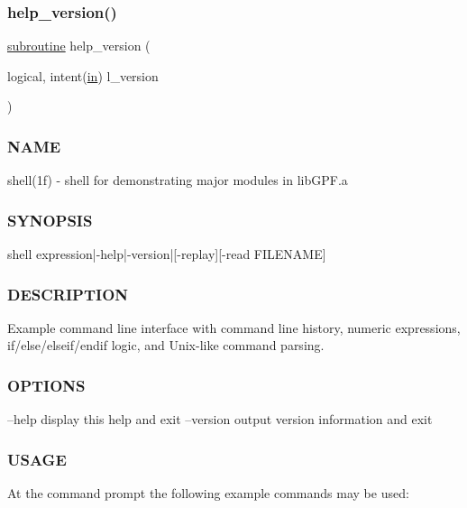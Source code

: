 \subsubsection{\texorpdfstring{help\+\_\+version()}{help\_version()}}
{\footnotesize\ttfamily \hyperlink{M__stopwatch_83_8txt_acfbcff50169d691ff02d4a123ed70482}{subroutine} help\+\_\+version (\begin{DoxyParamCaption}\item[{logical, intent(\hyperlink{M__journal_83_8txt_afce72651d1eed785a2132bee863b2f38}{in})}]{l\+\_\+version }\end{DoxyParamCaption})}



\subsubsection*{N\+A\+ME}

shell(1f) -\/ shell for demonstrating major modules in lib\+G\+P\+F.\+a 

\subsubsection*{S\+Y\+N\+O\+P\+S\+IS}

\begin{DoxyVerb}    shell expression|-help|-version|[-replay][-read FILENAME]
\end{DoxyVerb}


\subsubsection*{D\+E\+S\+C\+R\+I\+P\+T\+I\+ON}

Example command line interface with command line history, numeric expressions, if/else/elseif/endif logic, and Unix-\/like command parsing.

\subsubsection*{O\+P\+T\+I\+O\+NS}

--help display this help and exit --version output version information and exit

\subsubsection*{U\+S\+A\+GE}

At the command prompt the following example commands may be used\+:


